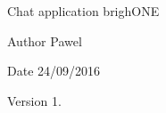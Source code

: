 Chat application brigh\+O\+NE

\begin{DoxyAuthor}{Author}
Pawel 
\end{DoxyAuthor}
\begin{DoxyDate}{Date}
24/09/2016 
\end{DoxyDate}
\begin{DoxyVersion}{Version}
1. 
\end{DoxyVersion}
